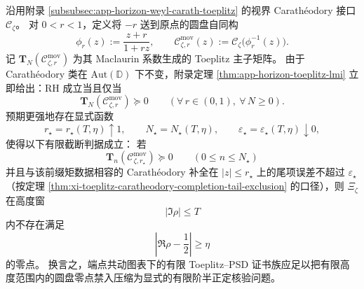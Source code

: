 \begin{conjecture}\label{conj:xi-endpoint-comoving-toeplitz-finite-closure}
沿用附录 \ref{subsubsec:app-horizon-weyl-carath-toeplitz} 的视界 Carath\'eodory 接口
\(\mathscr C_{\zeta}\)。
对 \(0<r<1\)，定义将 \(-r\) 送到原点的圆盘自同构
\[
\phi_r(z):=\frac{z+r}{1+r z},
\qquad
\mathscr C_{\zeta,r}^{\mathrm{mov}}(z):=\mathscr C_{\zeta}\!\bigl(\phi_r^{-1}(z)\bigr).
\]
记 \(\mathbf T_N(\mathscr C_{\zeta,r}^{\mathrm{mov}})\) 为其 Maclaurin 系数生成的 Toeplitz 主子矩阵。
由于 Carath\'eodory 类在 \(\mathrm{Aut}(\mathbb D)\) 下不变，附录定理 \ref{thm:app-horizon-toeplitz-lmi} 立即给出：RH 成立当且仅当
\[
\mathbf T_N(\mathscr C_{\zeta,r}^{\mathrm{mov}})\succeq 0
\qquad
(\forall\,r\in(0,1),\ \forall\,N\ge 0).
\]
预期更强地存在显式函数
\[
r_\star=r_\star(T,\eta)\uparrow 1,
\qquad
N_\star=N_\star(T,\eta),
\qquad
\varepsilon_\star=\varepsilon_\star(T,\eta)\downarrow 0,
\]
使得以下有限截断判据成立：
若
\[
\mathbf T_n(\mathscr C_{\zeta,r_\star}^{\mathrm{mov}})\succeq 0
\qquad (0\le n\le N_\star)
\]
并且与该前缀矩数据相容的 Carath\'eodory 补全在 \(|z|\le r_\star\) 上的尾项误差不超过 \(\varepsilon_\star\)（按定理 \ref{thm:xi-toeplitz-caratheodory-completion-tail-exclusion} 的口径），则 \(\Xi_{\zeta}\) 在高度窗
\[
|\Im \rho|\le T
\]
内不存在满足
\[
\left|\Re \rho-\frac12\right|\ge \eta
\]
的零点。
换言之，端点共动图表下的有限 Toeplitz--PSD 证书族应足以把有限高度范围内的圆盘零点禁入压缩为显式的有限阶半正定核验问题。
\end{conjecture}

\endinput
